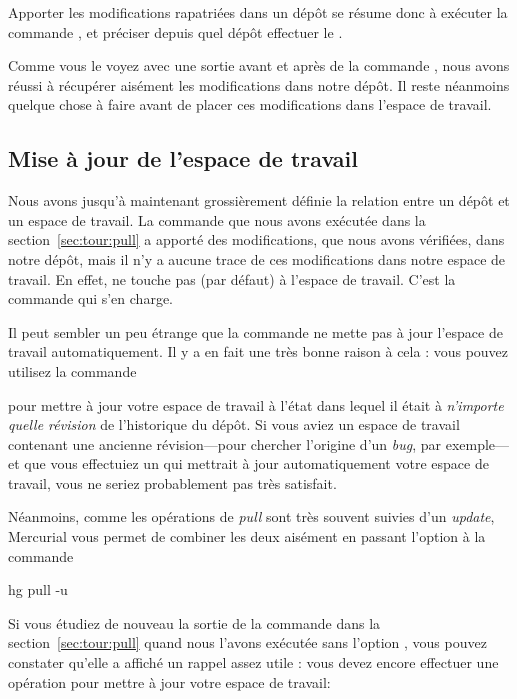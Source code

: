 Apporter les modifications rapatriées dans un dépôt se résume donc
à exécuter la commande , et préciser depuis quel dépôt 
effectuer le .

Comme vous le voyez avec une sortie avant et après de la commande
, nous avons réussi à récupérer aisément les modifications
dans notre dépôt. Il reste néanmoins quelque chose à faire avant de
placer ces modifications dans l'espace de travail.

\subsection{Mise à jour de l'espace de travail}

Nous avons jusqu'à maintenant grossièrement définie la relation 
entre un dépôt et un espace de travail. La commande  que
nous avons exécutée dans la section~\ref{sec:tour:pull} a apporté
des modifications, que nous avons vérifiées, dans notre dépôt, mais
il n'y a aucune trace de ces modifications dans notre espace de travail.
En effet,  ne touche pas (par défaut) à l'espace de 
travail. C'est la commande  qui s'en charge.

Il peut sembler un peu étrange que la commande  ne mette
pas à jour l'espace de travail automatiquement. Il y a en fait une
très bonne raison à cela : vous pouvez utilisez la commande 

 pour mettre à jour votre espace de travail à l'état
dans lequel il était à \emph{n'importe quelle révision} de l'historique
du dépôt. Si vous aviez un espace de travail contenant une ancienne
révision---pour chercher l'origine d'un \textit{bug}, par exemple---et
que vous effectuiez un  qui mettrait à jour automatiquement
votre espace de travail, vous ne seriez probablement pas très satisfait.

Néanmoins, comme les opérations de \textit{pull} sont très souvent
suivies d'un \textit{update}, Mercurial vous permet de combiner les
deux aisément en passant l'option  à la commande
\begin{codesample2}
  hg pull -u
\end{codesample2}

Si vous étudiez de nouveau la sortie de la commande  dans
la section~\ref{sec:tour:pull} quand nous l'avons exécutée sans l'option
, vous pouvez constater qu'elle a affiché un rappel assez
utile : vous devez encore effectuer une opération pour mettre à jour
votre espace de travail:

